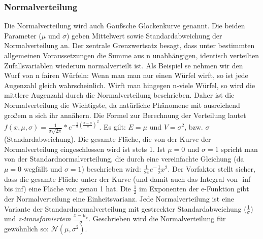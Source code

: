 \documentclass[letterpaper, titlepage]{article}
\begin{document}
\subsubsection{Normalverteilung}\label{Normalverteilung}
Die Normalverteilung wird auch Gaußsche Glockenkurve genannt. Die beiden Parameter ($\mu$  und $\sigma$) geben Mittelwert sowie Standardabweichung der Normalverteilung an. Der zentrale Grenzwertsatz besagt, dass unter bestimmten allgemeinen Voraussetzungen die Summe aus n unabhängigen, identisch verteilten Zufallsvariablen wiederum normalverteilt ist. Als Beispiel se nehmen wir den Wurf von n fairen Würfeln: Wenn man man nur einen Würfel wirft, so ist jede Augenzahl gleich wahrscheinlich. Wirft man hingegen n-viele Würfel, so wird die mittlere Augenzahl durch die Normalverteilung beschrieben. Daher ist die Normalverteilung die Wichtigste, da natürliche Phänomene mit ausreichend großem n sich ihr annähern. Die Formel zur Berechnung der Verteilung lautet \textit{$f(x,\mu, \sigma)=\frac{1}{\sigma\sqrt{2\pi}}*e^{-\frac{1}{2}(\frac{x-\mu}{\sigma})^2}$}. Es gilt: $E=\mu$ und $V=\sigma^2$, bzw. $\sigma$ (Standardabweichung). Die gesamte Fläche, die von der Kurve der Normalverteilung eingeschlossen wird ist stets 1. Ist $\mu=0$ und $\sigma=1$ spricht man von der Standardnormalverteilung, die durch eine vereinfachte Gleichung (da $\mu=0$ wegfällt und $\sigma=1$) beschrieben wird: $\frac{1}{2\pi}e^-\frac{1}{2}x^2$. Der Vorfaktor stellt sicher, dass die gesamte Fläche unter der Kurve (und damit auch das Integral von -inf bis inf) eine Fläche von genau 1 hat. Die $\frac{1}{2}$ im Exponenten der e-Funktion gibt der Normalverteilung eine Einheitsvarianz. Jede Normalverteilung ist eine Variante der Standardnormalverteilung mit gestreckter Standardabweichung ($\frac{1}{\sigma}$) und \textit{z-transfomiertem} $\frac{x-\mu_x}{\sigma}$. Geschrieben wird die Normalverteilung für gewöhnlich so: $\mathcal{N}(\mu, \sigma^2)$. 
\end{document}
